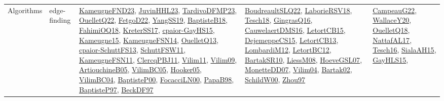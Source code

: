 {\begin{longtable}{lp{3cm}>{\raggedright}p{6cm}>{\raggedright}p{6cm}p{8cm}}
Algorithms & edge-finding & \href{papers/KameugneFND23.pdf}{KameugneFND23}\cite{KameugneFND23}, \href{papers/JuvinHHL23.pdf}{JuvinHHL23}\cite{JuvinHHL23}, \href{papers/TardivoDFMP23.pdf}{TardivoDFMP23}\cite{TardivoDFMP23}, \href{papers/OuelletQ22.pdf}{OuelletQ22}\cite{OuelletQ22}, \href{articles/FetgoD22.pdf}{FetgoD22}\cite{FetgoD22}, \href{papers/YangSS19.pdf}{YangSS19}\cite{YangSS19}, \href{articles/BaptisteB18.pdf}{BaptisteB18}\cite{BaptisteB18}, \href{articles/FahimiOQ18.pdf}{FahimiOQ18}\cite{FahimiOQ18}, \href{articles/KreterSS17.pdf}{KreterSS17}\cite{KreterSS17}, \href{papers/cpaior-GayHS15.pdf}{cpaior-GayHS15}\cite{cpaior-GayHS15}, \href{articles/Kameugne15.pdf}{Kameugne15}\cite{Kameugne15}, \href{articles/KameugneFSN14.pdf}{KameugneFSN14}\cite{KameugneFSN14}, \href{papers/OuelletQ13.pdf}{OuelletQ13}\cite{OuelletQ13}, \href{papers/cpaior-SchuttFS13.pdf}{cpaior-SchuttFS13}\cite{cpaior-SchuttFS13}, \href{articles/SchuttFSW11.pdf}{SchuttFSW11}\cite{SchuttFSW11}, \href{papers/KameugneFSN11.pdf}{KameugneFSN11}\cite{KameugneFSN11}, \href{papers/ClercqPBJ11.pdf}{ClercqPBJ11}\cite{ClercqPBJ11}, \href{papers/Vilim11.pdf}{Vilim11}\cite{Vilim11}, \href{papers/Vilim09.pdf}{Vilim09}\cite{Vilim09}, \href{papers/ArtiouchineB05.pdf}{ArtiouchineB05}\cite{ArtiouchineB05}, \href{articles/VilimBC05.pdf}{VilimBC05}\cite{VilimBC05}, \href{articles/Hooker05.pdf}{Hooker05}\cite{Hooker05}, \href{papers/VilimBC04.pdf}{VilimBC04}\cite{VilimBC04}, \href{articles/BaptisteP00.pdf}{BaptisteP00}\cite{BaptisteP00}, \href{papers/FocacciLN00.pdf}{FocacciLN00}\cite{FocacciLN00}, \href{articles/PapaB98.pdf}{PapaB98}\cite{PapaB98}, \href{papers/BaptisteP97.pdf}{BaptisteP97}\cite{BaptisteP97}, \href{papers/BeckDF97.pdf}{BeckDF97}\cite{BeckDF97} & \href{papers/BoudreaultSLQ22.pdf}{BoudreaultSLQ22}\cite{BoudreaultSLQ22}, \href{articles/LaborieRSV18.pdf}{LaborieRSV18}\cite{LaborieRSV18}, \href{papers/Tesch18.pdf}{Tesch18}\cite{Tesch18}, \href{papers/GingrasQ16.pdf}{GingrasQ16}\cite{GingrasQ16}, \href{papers/CauwelaertDMS16.pdf}{CauwelaertDMS16}\cite{CauwelaertDMS16}, \href{articles/LetortCB15.pdf}{LetortCB15}\cite{LetortCB15}, \href{papers/DejemeppeCS15.pdf}{DejemeppeCS15}\cite{DejemeppeCS15}, \href{papers/LetortCB13.pdf}{LetortCB13}\cite{LetortCB13}, \href{articles/LombardiM12.pdf}{LombardiM12}\cite{LombardiM12}, \href{papers/LetortBC12.pdf}{LetortBC12}\cite{LetortBC12}, \href{articles/BartakSR10.pdf}{BartakSR10}\cite{BartakSR10}, \href{articles/LiessM08.pdf}{LiessM08}\cite{LiessM08}, \href{papers/HoeveGSL07.pdf}{HoeveGSL07}\cite{HoeveGSL07}, \href{papers/MonetteDD07.pdf}{MonetteDD07}\cite{MonetteDD07}, \href{papers/Vilim04.pdf}{Vilim04}\cite{Vilim04}, \href{papers/Bartak02.pdf}{Bartak02}\cite{Bartak02}, \href{articles/SchildW00.pdf}{SchildW00}\cite{SchildW00}, \href{articles/Zhou97.pdf}{Zhou97}\cite{Zhou97} & \href{articles/CampeauG22.pdf}{CampeauG22}\cite{CampeauG22}, \href{articles/WallaceY20.pdf}{WallaceY20}\cite{WallaceY20}, \href{papers/OuelletQ18.pdf}{OuelletQ18}\cite{OuelletQ18}, \href{articles/NattafAL17.pdf}{NattafAL17}\cite{NattafAL17}, \href{papers/Tesch16.pdf}{Tesch16}\cite{Tesch16}, \href{papers/SialaAH15.pdf}{SialaAH15}\cite{SialaAH15}, \href{papers/GayHLS15.pdf}{GayHLS15}\cite{GayHLS15}, 
\end{longtable}}
